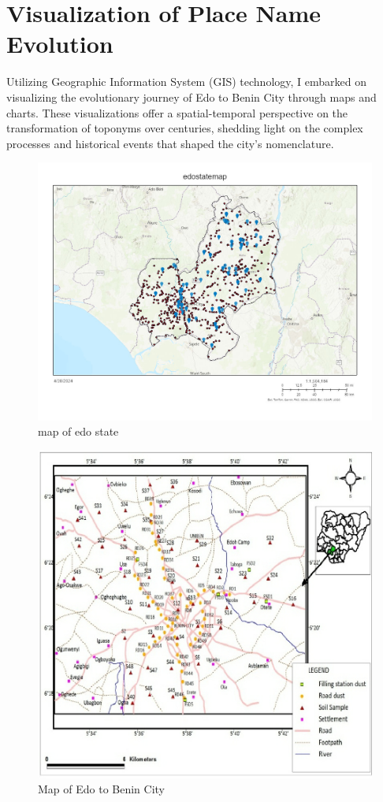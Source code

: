 \section{Visualization of Place Name Evolution}

Utilizing Geographic Information System (GIS) technology, I embarked on visualizing the evolutionary journey of Edo to Benin City through maps and charts. These visualizations offer a spatial-temporal perspective on the transformation of toponyms over centuries, shedding light on the complex processes and historical events that shaped the city's nomenclature.

\begin{figure}[h!]
    \centering
    \includegraphics[width=1\linewidth]{edostate_updated.jpg}
    \caption{map of edo state}
    \label{fig:edostatemap}
\end{figure}
\vspace{1cm} 
\begin{figure}[h!]
    \centering
    \includegraphics[width=1\linewidth]{edobenin.png}
    \caption{Map of Edo to Benin City }
    \label{fig:edobeninstatemap}
\end{figure}


